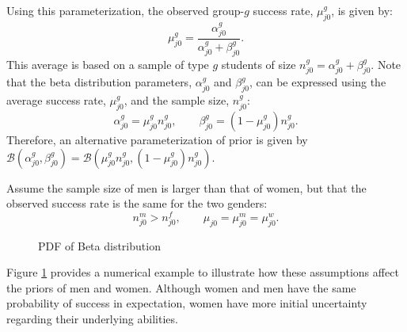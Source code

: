 \documentclass[10 pt]{article}
\newcommand{\pr}[1]{\left( #1 \right)}
\begin{document}
Using this parameterization, the observed group-$g$ success rate, $\mu_{j0}^g$, is given by:
\begin{equation*}
\mu_{j0}^g = 
  \frac{\alpha_{j0}^g}{\alpha_{j0}^g + \beta_{j0}^g}.
\end{equation*}
This average is based on a sample of type $g$ students of size $n_{j0}^g = \alpha_{j0}^g + \beta_{j0}^g$.
Note that the beta distribution parameters, $\alpha_{j0}^g$ and $\beta_{j0}^g$, can be expressed using the average success rate, $\mu_{j0}^g$, and the sample size, $n_{j0}^g$:
\begin{equation*}
     \alpha_{j0}^g = \mu_{j0}^g n_{j0}^g,
     \quad \quad \beta_{j0}^g = (1 - \mu_{j0}^g) n_{j0}^g.
 \end{equation*}
 Therefore, an alternative parameterization of prior is given by $\mathcal{B} \pr{\alpha_{j0}^g, \beta_{j0}^g} = \mathcal{B} \pr{\mu_{j0}^g n_{j0}^g, (1 - \mu_{j0}^g) n_{j0}^g}$.
 
Assume the sample size of men is larger than that of women, but that the observed success rate is the same for the two genders:
\begin{equation*}
  n_{j0}^m > n_{j0}^f, \quad \quad \mu_{j0} = \mu_{j0}^m = \mu_{j0}^w.
\end{equation*}
\begin{figure}
\centering

\caption{PDF of Beta distribution}
\label{beta_distribution}
\end{figure}
Figure \ref{beta_distribution} provides a numerical example to illustrate how these assumptions affect the priors of men and women. 
Although women and men have the same probability of success in expectation, women have more initial uncertainty regarding their underlying abilities. 
\end{document}
